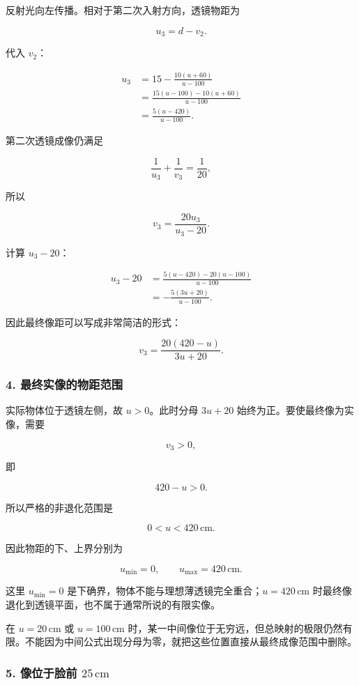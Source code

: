 \documentclass[12pt,a4paper,UTF8]{ctexart}
\begin{document}
反射光向左传播。相对于第二次入射方向，透镜物距为

\[
u_3=d-v_2.
\]

代入 \(v_2\)：

\[
\begin{aligned}
u_3
&=15-\frac{10(u+60)}{u-100}\\
&=\frac{15(u-100)-10(u+60)}{u-100}\\
&=\frac{5(u-420)}{u-100}.
\end{aligned}
\]

第二次透镜成像仍满足

\[
\frac{1}{u_3}+\frac{1}{v_3}=\frac{1}{20},
\]

所以

\[
v_3=\frac{20u_3}{u_3-20}.
\]

计算 \(u_3-20\)：

\[
\begin{aligned}
u_3-20
&=\frac{5(u-420)-20(u-100)}{u-100}\\
&=-\frac{5(3u+20)}{u-100}.
\end{aligned}
\]

因此最终像距可以写成非常简洁的形式：

\[
\boxed{
v_3=\frac{20(420-u)}{3u+20}
}.
\]

\subsubsection{4.
最终实像的物距范围}\label{ux6700ux7ec8ux5b9eux50cfux7684ux7269ux8dddux8303ux56f4}

实际物体位于透镜左侧，故 \(u>0\)。此时分母 \(3u+20\)
始终为正。要使最终像为实像，需要

\[
v_3>0,
\]

即

\[
420-u>0.
\]

所以严格的非退化范围是

\[
\boxed{0<u<420\,\mathrm{cm}}.
\]

因此物距的下、上界分别为

\[
\boxed{u_{\min}=0},
\qquad
\boxed{u_{\max}=420\,\mathrm{cm}}.
\]

这里 \(u_{\min}=0\)
是下确界，物体不能与理想薄透镜完全重合；\(u=420\,\mathrm{cm}\)
时最终像退化到透镜平面，也不属于通常所说的有限实像。

在 \(u=20\,\mathrm{cm}\) 或 \(u=100\,\mathrm{cm}\)
时，某一中间像位于无穷远，但总映射的极限仍然有限。不能因为中间公式出现分母为零，就把这些位置直接从最终成像范围中删除。

\subsubsection{\texorpdfstring{5. 像位于脸前
\(25\,\mathrm{cm}\)}{5. 像位于脸前 25\textbackslash,\textbackslash mathrm\{cm\}}}\label{ux50cfux4f4dux4e8eux8138ux524d-25mathrmcm}
\end{document}
